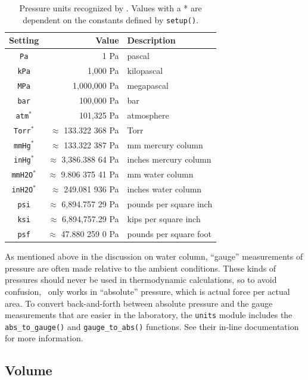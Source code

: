 \begin{table}
\centering
\caption{Pressure units recognized by \PM. Values with a * are dependent on the constants defined by \texttt{setup()}.}\label{tab:pressure}
\begin{tabular}{crl}
\hline
Setting & Value & Description\\
\hline
\verb|Pa| & 1 Pa & pascal\\
\verb|kPa| & 1,000 Pa & kilopascal\\
\verb|MPa| & 1,000,000 Pa & megapascal\\
\verb|bar| & 100,000 Pa & bar\\
\verb|atm|$^*$ & 101,325 Pa & atmosphere\\
\verb|Torr|$^*$ & $\approx$ 133.322 368 Pa & Torr\\
\verb|mmHg|$^*$ & $\approx$ 133.322 387 Pa & mm mercury column\\
\verb|inHg|$^*$ & $\approx$ 3,386.388 64 Pa & inches mercury column\\
\verb|mmH2O|$^*$ & $\approx$ 9.806 375 41 Pa & mm water column\\
\verb|inH2O|$^*$ & $\approx$ 249.081 936 Pa & inches water column\\
\verb|psi| & $\approx$ 6,894.757 29 Pa & pounds per square inch\\
\verb|ksi| & $\approx$ 6,894,757.29 Pa & kips per square inch\\
\verb|psf| & $\approx$ 47.880 259 0 Pa & pounds per square foot\\
\hline
\end{tabular}
\end{table}

As mentioned above in the discussion on water column, ``gauge'' measurements of pressure are often made relative to the ambient conditions.  These kinds of pressures should never be used in thermodynamic calculations, so to avoid confusion, \PM\ only works in ``absolute'' pressure, which is actual force per actual area.  To convert back-and-forth between absolute pressure and the gauge measurements that are easier in the laboratory, the \texttt{units} module includes the \verb|abs_to_gauge()| and \verb|gauge_to_abs()| functions.  See their in-line documentation for more information.

%
%

\subsection{Volume}\label{sec:units:volume}

